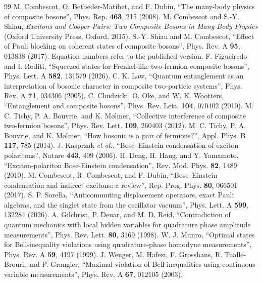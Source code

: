 \documentclass[11pt,a4paper]{article}
\begin{document}
\begin{thebibliography}{99}
 M. Combescot, O. Betbeder-Matibet, and F. Dubin, ``The many-body physics of composite bosons'', Phys. Rep. \textbf{463}, 215 (2008).
 M. Combescot and S.-Y. Shiau, \emph{Excitons and Cooper Pairs: Two Composite Bosons in Many-Body Physics} (Oxford University Press, Oxford, 2015).
 S.-Y. Shiau and M. Combescot, ``Effect of Pauli blocking on coherent states of composite bosons'', Phys. Rev. A \textbf{95}, 013838 (2017). Equation numbers refer to the published version.
 F. Figueiredo and I. Roditi, ``Squeezed states for Frenkel-like two-fermion composite bosons'', Phys. Lett. A \textbf{582}, 131579 (2026).
 C. K. Law, ``Quantum entanglement as an interpretation of bosonic character in composite two-particle systems'', Phys. Rev. A \textbf{71}, 034306 (2005).
 C. Chudzicki, O. Oke, and W. K. Wootters, ``Entanglement and composite bosons'', Phys. Rev. Lett. \textbf{104}, 070402 (2010).
 M. C. Tichy, P. A. Bouvrie, and K. M\o lmer, ``Collective interference of composite two-fermion bosons'', Phys. Rev. Lett. \textbf{109}, 260403 (2012).
 M. C. Tichy, P. A. Bouvrie, and K. M\o lmer, ``How bosonic is a pair of fermions?'', Appl. Phys. B \textbf{117}, 785 (2014).
 J. Kasprzak \emph{et al.}, ``Bose--Einstein condensation of exciton polaritons'', Nature \textbf{443}, 409 (2006).
 H. Deng, H. Haug, and Y. Yamamoto, ``Exciton-polariton Bose-Einstein condensation'', Rev. Mod. Phys. \textbf{82}, 1489 (2010).
 M. Combescot, R. Combescot, and F. Dubin, ``Bose--Einstein condensation and indirect excitons: a review'', Rep. Prog. Phys. \textbf{80}, 066501 (2017).
 S. P. Sorella, ``Anticommuting displacement operators, exact Pauli algebras, and the singlet state from the oscillator vacuum'', Phys. Lett. A \textbf{599}, 132284 (2026).
 A. Gilchrist, P. Deuar, and M. D. Reid, ``Contradiction of quantum mechanics with local hidden variables for quadrature phase amplitude measurements'', Phys. Rev. Lett. \textbf{80}, 3169 (1998).
 W. J. Munro, ``Optimal states for Bell-inequality violations using quadrature-phase homodyne measurements'', Phys. Rev. A \textbf{59}, 4197 (1999).
 J. Wenger, M. Hafezi, F. Grosshans, R. Tualle-Brouri, and P. Grangier, ``Maximal violation of Bell inequalities using continuous-variable measurements'', Phys. Rev. A \textbf{67}, 012105 (2003).

\end{thebibliography}
\end{document}
